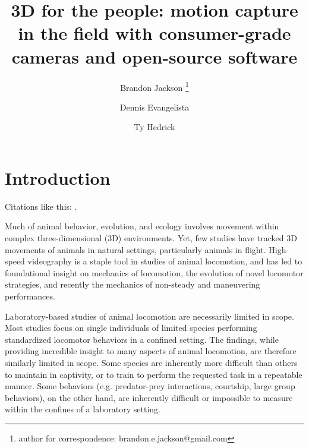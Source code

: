 \documentclass[fleqn,10pt]{wlpeerj}
\title{3D for the people: motion capture in the field with consumer-grade cameras and open-source software}
\author[1,2]{Brandon Jackson \thanks{author for correspondence: brandon.e.jackson@gmail.com}}
\author[2]{Dennis Evangelista}
\author[2]{Ty Hedrick}
\affil[1]{Longwood College, Charlottesville, VA}
\affil[2]{University of North Carolina at Chapel Hill, NC 27599-3280, USA}
\begin{document}
\newcommand{\ty}[1]{{\color{blue} #1}}
\newcommand{\dennis}[1]{{\color{green} #1}}
\newcommand{\brandon}[1]{{\color{cyan} #1}}

\flushbottom
\maketitle
\thispagestyle{empty}

\modulolinenumbers[5]
\linenumbers

\section*{Introduction}

Citations like this: \citep{Bradski:2008,Theriault:2014,Hartley:xxxx}. 

Much of animal behavior, evolution, and ecology involves movement within complex three-dimensional (3D) environments.  Yet, few studies have tracked 3D movements of animals in natural settings, particularly animals in flight.  High-speed videography is a staple tool in studies of animal locomotion, and has led to foundational insight on mechanics of locomotion, the evolution of novel locomotor strategies, and recently the mechanics of non-steady and maneuvering performances.  

Laboratory-based studies of animal locomotion are necessarily limited in scope.  Most studies focus on single individuals of limited species performing standardized locomotor behaviors \ty{in a confined setting}.  The findings, while providing incredible insight to many aspects of animal locomotion, are therefore similarly limited in scope.  Some species are inherently more difficult than others to maintain in captivity, or to train to perform the requested task in a repeatable manner.  Some behaviors (e.g. predator-prey interactions, courtship, large group behaviors), on the other hand, are inherently \ty{difficult or }impossible to measure within the confines of a laboratory setting.  
\end{document}
